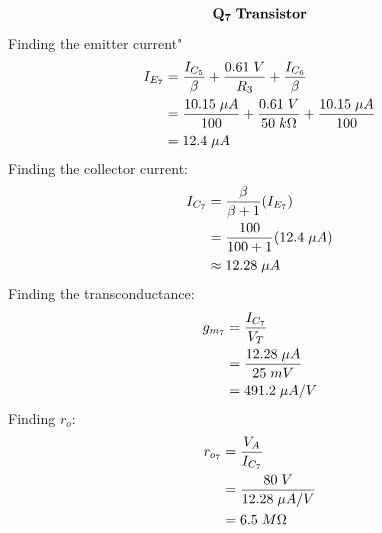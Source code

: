 \documentclass{article}
\begin{document}
	\begin{align*}
		\mathbf{Q_{7}} \hspace{1mm} \textbf{Transistor}
	\end{align*}
	Finding the emitter current"
	\begin{align*}
		I_{E_7} &= \frac{I_{C_5}}{\beta} + \frac{0.61 \hspace{1mm} V}{R_3} + \frac{I_{C_6}}{\beta}\\
		&= \frac{10.15 \hspace{1mm} \mu A}{100} + \frac{0.61 \hspace{1mm} V}{50 \hspace{1mm} k\Omega} + \frac{10.15 \hspace{1mm} \mu A}{100}\\
		&= 12.4 \hspace{1mm} \mu A
	\end{align*}
	Finding the collector current:
	\begin{align*}
		I_{C_7} &= \frac{\beta}{\beta + 1} (I_{E_7})\\
		&= \frac{100}{100 + 1} (12.4 \hspace{1mm} \mu A)\\
		&\approx 12.28 \hspace{1mm} \mu A		
	\end{align*}
	Finding the transconductance:
	\begin{align*}
		g_{m_7} &= \frac{I_{C_7}}{V_T}\\
		&= \frac{12.28 \hspace{1mm} \mu A}{25 \hspace{1mm} mV}\\
		&= 491.2 \hspace{1mm} \mu A/V
	\end{align*}
	Finding $r_o$:
	\begin{align*}
		r_{o_7} &= \frac{V_A}{I_{C_7}}\\
		&= \frac{80 \hspace{1mm} V}{12.28 \hspace{1mm} \mu A/V}\\
		&= 6.5 \hspace{1mm} M\Omega
	\end{align*}
\end{document}
